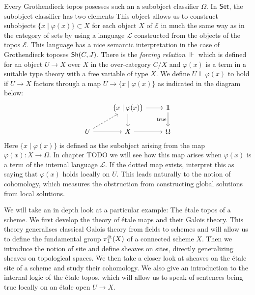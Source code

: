 Every Grothendieck topos posesses such an a subobject classifier $\Omega$. In $\mathsf{Set}$, the subobject classifier has two elements This object allows us to construct subobjects $\{x \mid \varphi(x)\} \subset X$ for each object $X$ of $\mathcal{E}$ in much the same way as in the category of sets by using a language $\mathcal{L}$ constructed from the objects of the topos $\mathcal{E}$. This language has a nice semantic interpretation in the case of Grothendieck toposes $\operatorname{\mathsf{Sh}}(C,J)$. There is the \textit{forcing relation} $\Vdash$ which is defined for an object $U \to X$ over $X$ in the over-category $C/X$ and $\varphi(x)$ is a term in a suitable type theory with a free variable of type $X$. We define $U \Vdash \varphi(x)$ to hold if $U \to X$ factors through a map $U \to \{x \mid \varphi(x)\}$ as indicated in the diagram below:
\[
	\begin{tikzcd}
		& {\{x \mid \varphi(x)\}} & {\mathbf{1}} \\
		U & X & \Omega
		\arrow[from=2-1, to=2-2]
		\arrow[dashed, from=2-1, to=1-2]
		\arrow[from=1-2, to=1-3]
		\arrow["{\text{true}}"', from=1-3, to=2-3]
		\arrow[from=1-2, to=2-2]
		\arrow[from=2-2, to=2-3]
	\end{tikzcd}
\]
Here $\{ x \mid \varphi(x)\}$ is defined as the subobject arising from the map $\varphi(x) \colon X \to \Omega$. In chapter TODO we will see how this map arises when $\varphi(x)$ is a term of the internal language $\mathcal{L}$. If the dotted map exists, interpret this as saying that $\varphi(x)$ holds locally on $U$. This leads naturally to the notion of cohomology, which measures the obstruction from constructing global solutions from local solutions.\par

We will take an in depth look at a particular example: The \'etale topos of a scheme. We first develop the theory of \'etale maps and their Galois theory. This theory generalises classical Galois theory from fields to schemes and will allow us to define the fundamental group $\pi_1^{\text{\'et}}(X)$ of a connected scheme $X$. Then we introduce the notion of site and define sheaves on sites, directly generalizing sheaves on topological spaces. We then take a closer look at sheaves on the \'etale site of a scheme and study their cohomology. We also give an introduction to the internal logic of the \'etale topos, which will allow us to speak of sentences being true locally on an \'etale open $U \to X$.\par

